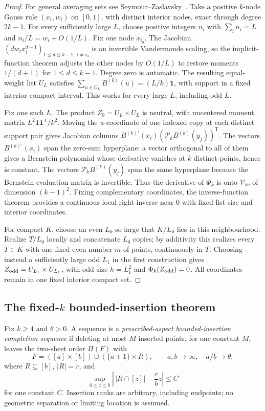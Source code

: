 \begin{proof}
For general averaging sets see Seymour--Zaslavsky~\cite{SeymourZaslavsky}.
Take a positive $k$-node Gauss rule $(x_i,w_i)$ on $[0,1]$, with distinct
interior nodes, exact through degree $2k-1$. For every sufficiently large
$L$, choose positive integers $n_i$ with $\sum_i n_i=L$ and
$n_i/L=w_i+O(1/L)$. Fix one node $x_{i_0}$. The Jacobian
$(d w_i x_i^{d-1})_{1\le d\le k-1,\ i\ne i_0}$ is an invertible
Vandermonde scaling, so the implicit-function theorem adjusts the other
nodes by $O(1/L)$ to restore moments $1/(d+1)$ for $1\le d\le k-1$.
Degree zero is automatic. The resulting equal-weight list $U_L$ satisfies
$\sum_{u\in U_L}B^{(k)}(u)=(L/k)\mathbf1$, with support in a fixed interior
compact interval. This works for every large $L$, including odd $L$.

Fix one such $L$.  The product $Z_0=U_L\times U_L$ is neutral, with
uncentered moment matrix $L^2\mathbf1\mathbf1^{\mathsf T}/k^2$.  Moving the
$u$-coordinate of one indexed copy at each distinct support pair gives
Jacobian columns
$B^{(k)\prime}(x_i)(\mathcal P_kB^{(k)}(y_j))^{\mathsf T}$.  The vectors
$B^{(k)\prime}(x_i)$ span the zero-sum hyperplane: a vector orthogonal to
all of them gives a Bernstein polynomial whose derivative vanishes at $k$
distinct points, hence is constant.  The vectors
$\mathcal P_kB^{(k)}(y_j)$ span the same hyperplane because the Bernstein
evaluation matrix is invertible.  Thus the derivative of $\Phi_k$ is onto
$\mathcal V_k$, of dimension $(k-1)^2$.  Fixing complementary coordinates,
the inverse-function theorem provides a continuous local right inverse near
$0$ with fixed list size and interior coordinates.

For compact $K$, choose an even $L_0$ so large that $K/L_0$ lies in this
neighbourhood.  Realize $T/L_0$ locally and concatenate $L_0$ copies; by
additivity this realizes every $T\in K$ with one fixed even number $m$ of
points, continuously in $T$.  Choosing instead a sufficiently large odd
$L_1$ in the first construction gives
$Z_{\rm odd}=U_{L_1}\times U_{L_1}$, with odd size $h=L_1^2$ and
$\Phi_k(Z_{\rm odd})=0$.  All coordinates remain in one fixed interior
compact set.
\end{proof}

\subsection{The fixed-\texorpdfstring{$k$}{k} bounded-insertion theorem}
Fix $k\ge4$ and $\theta>0$.  A sequence is a
\emph{prescribed-aspect bounded-insertion completion sequence} if deleting
at most $M$ inserted points, for one constant $M$, leaves the two-sheet order
$\Pi(F)$ with
\[
 F=([a]\times[b])\cup(\{a+1\}\times R),\qquad
 a,b\to\infty,\quad a/b\to\theta,
\]
where $R\subseteq[b]$, $|R|=r$, and
\[
 \sup_{0\le z\le b}\left|\,|R\cap[z]|-\frac rbz\right|\le C
\]
for one constant $C$.  Insertion ranks are arbitrary, including endpoints;
no geometric separation or limiting location is assumed.

